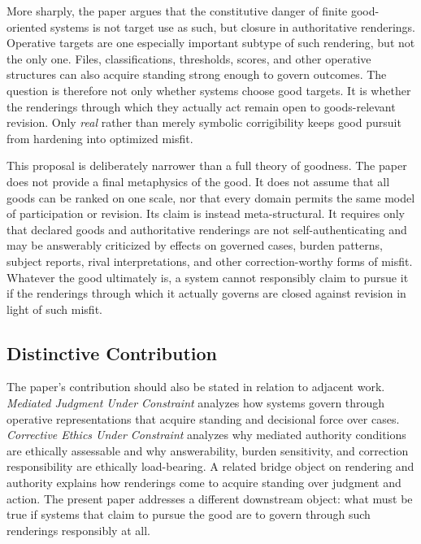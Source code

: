 \documentclass[11pt]{article}
\renewcommand{\emph}[1]{\textit{#1}}
\begin{document}
More sharply, the paper argues that the constitutive danger of finite good-oriented systems is not target use as such, but closure in authoritative renderings. Operative targets are one especially important subtype of such rendering, but not the only one. Files, classifications, thresholds, scores, and other operative structures can also acquire standing strong enough to govern outcomes. The question is therefore not only whether systems choose good targets. It is whether the renderings through which they actually act remain open to goods-relevant revision. Only \emph{real} rather than merely symbolic corrigibility keeps good pursuit from hardening into optimized misfit.

This proposal is deliberately narrower than a full theory of goodness. The paper does not provide a final metaphysics of the good. It does not assume that all goods can be ranked on one scale, nor that every domain permits the same model of participation or revision. Its claim is instead meta-structural. It requires only that declared goods and authoritative renderings are not self-authenticating and may be answerably criticized by effects on governed cases, burden patterns, subject reports, rival interpretations, and other correction-worthy forms of misfit. Whatever the good ultimately is, a system cannot responsibly claim to pursue it if the renderings through which it actually governs are closed against revision in light of such misfit.

\subsection{Distinctive Contribution}

The paper's contribution should also be stated in relation to adjacent work. \emph{Mediated Judgment Under Constraint} analyzes how systems govern through operative representations that acquire standing and decisional force over cases. \emph{Corrective Ethics Under Constraint} analyzes why mediated authority conditions are ethically assessable and why answerability, burden sensitivity, and correction responsibility are ethically load-bearing.\cite{Swanson2026MediatedJudgmentConstraint,Swanson2026CorrectiveEthicsConstraint} A related bridge object on rendering and authority explains how renderings come to acquire standing over judgment and action. The present paper addresses a different downstream object: what must be true if systems that claim to pursue the good are to govern through such renderings responsibly at all.
\end{document}
